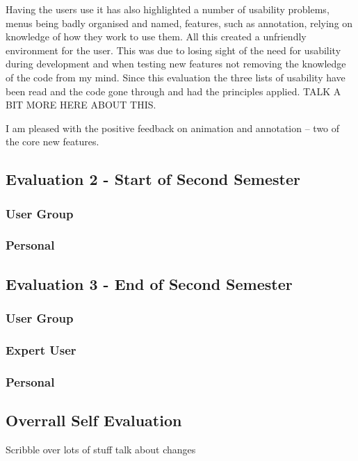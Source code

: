Having the users use it has also highlighted a number of usability problems, menus being badly organised and named, features, such as annotation, relying on knowledge of how they work to use them.  All this created a unfriendly environment for the user.  This was due to losing sight of the need for usability during development and when testing new features not removing the knowledge of the code from my mind.  Since this evaluation the three lists of usability have been read and the code gone through and had the principles applied.  TALK A BIT MORE HERE ABOUT THIS.

I am pleased with the positive feedback on animation and annotation -- two of the core new features.

\subsection{Evaluation 2 - Start of Second Semester}
\subsubsection{User Group}
\subsubsection{Personal}

\subsection{Evaluation 3 - End of Second Semester}
\subsubsection{User Group}
\subsubsection{Expert User}
\subsubsection{Personal}

\subsection{Overrall Self Evaluation}
Scribble over lots of stuff talk about changes
